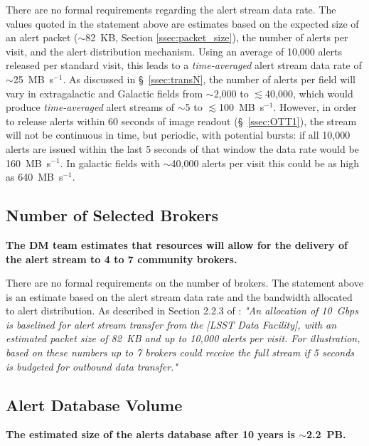 \documentclass[DM,lsstdraft,authoryear,toc]{lsstdoc}
\begin{document}
There are no formal requirements regarding the alert stream data rate. The values quoted in the statement above are estimates based on the expected size of an alert packet ($\sim$82~KB, Section \ref{ssec:packet_size}), the number of alerts per visit, and the alert distribution mechanism. Using an average of 10,000 alerts released per standard visit, this leads to a {\it time-averaged} alert stream data rate of  $\sim$25~MB~s$^{-1}$. As discussed in \S~\ref{ssec:transN}, the number of alerts per field will vary in extragalactic and Galactic fields from $\sim$2,000 to $\lesssim$40,000, which would produce {\it time-averaged} alert streams of $\sim$5 to $\lesssim$100~MB~s$^{-1}$. However, in order to release alerts within 60 seconds of image readout (\S~\ref{ssec:OTT1}), the stream will not be continuous in time, but periodic, with potential bursts: if all 10,000 alerts are issued within the last 5 seconds of that window the data rate would be 160~MB~s$^{-1}$. In galactic fields with $\sim$40,000 alerts per visit this could be as high as 640~MB~s$^{-1}$.


\subsection{Number of Selected Brokers}\label{ssec:num_brokers}

{\bf The DM team estimates that resources will allow for the delivery of the alert stream to 4 to 7 community brokers.}

There are no formal requirements on the number of brokers. The statement above is an estimate based on the alert stream data rate and the bandwidth allocated to alert distribution. As described in Section 2.2.3 of : {\it "An allocation of 10~Gbps is baselined for alert stream transfer from the [LSST Data Facility], with an estimated packet size of 82~KB and up to 10,000 alerts per visit. For illustration, based on these numbers up to 7 brokers could receive the full stream if 5 seconds is budgeted for outbound data transfer."} 


\subsection{Alert Database Volume}\label{ssec:adb_volume}

{\bf The estimated size of the alerts database after 10 years is $\sim$2.2~PB.}
\end{document}
